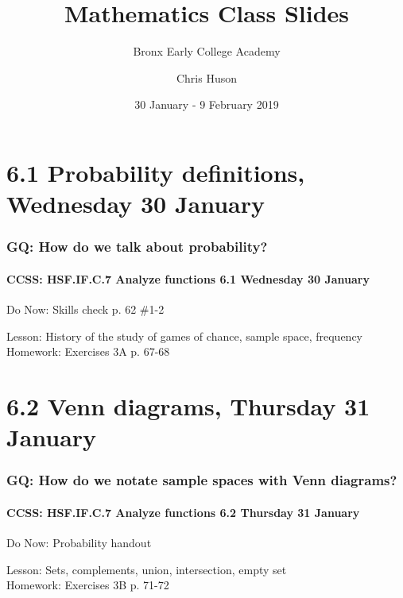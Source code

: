 \documentclass{beamer}
\title{Mathematics Class Slides}
\subtitle{Bronx Early College Academy}
\author{Chris Huson}
\date{30 January - 9 February 2019}
\begin{document}
\frame{\titlepage}

\section[Outline]{}
\frame{\tableofcontents}

\section{6.1 Probability definitions, Wednesday 30 January}
  \frame
  {
    \frametitle{GQ: How do we talk about probability?}
    \framesubtitle{CCSS: HSF.IF.C.7 Analyze functions \hfill \alert{6.1 Wednesday 30 January}}

    \begin{block}{Do Now: Skills check p. 62 \#1-2}
    \end{block}
    Lesson: History of the study of games of chance, sample space, frequency \\ \bigskip
    Homework: Exercises 3A p. 67-68
  }


\section{6.2 Venn diagrams, Thursday 31 January}
  \frame
  {
    \frametitle{GQ: How do we notate sample spaces with Venn diagrams?}
    \framesubtitle{CCSS: HSF.IF.C.7 Analyze functions \hfill  \alert{6.2 Thursday 31 January}}

    \begin{block}{Do Now: Probability handout}
    \end{block}
    Lesson: Sets, complements, union, intersection, empty set \\ \bigskip
    Homework: Exercises 3B p. 71-72
  }
\end{document}
